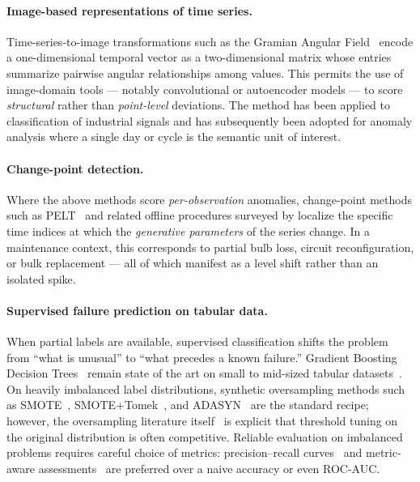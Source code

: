 \documentclass[11pt]{article}
\begin{document}
\paragraph{Image-based representations of time series.}
Time-series-to-image transformations such as the Gramian Angular Field~\cite{wang2015gaf,wang2015imaging} encode a one-dimensional temporal vector as a two-dimensional matrix whose entries summarize pairwise angular relationships among values. This permits the use of image-domain tools --- notably convolutional or autoencoder models --- to score \emph{structural} rather than \emph{point-level} deviations. The method has been applied to classification of industrial signals and has subsequently been adopted for anomaly analysis where a single day or cycle is the semantic unit of interest.

\paragraph{Change-point detection.}
Where the above methods score \emph{per-observation} anomalies, change-point methods such as PELT~\cite{killick2012pelt} and related offline procedures surveyed by \cite{truong2020ruptures,aminikhanghahi2017survey} localize the specific time indices at which the \emph{generative parameters} of the series change. In a maintenance context, this corresponds to partial bulb loss, circuit reconfiguration, or bulk replacement --- all of which manifest as a level shift rather than an isolated spike.

\paragraph{Supervised failure prediction on tabular data.}
When partial labels are available, supervised classification shifts the problem from ``what is unusual'' to ``what precedes a known failure.'' Gradient Boosting Decision Trees~\cite{friedman2001gbm,chen2016xgboost} remain state of the art on small to mid-sized tabular datasets~\cite{shwartz2022tabular}. On heavily imbalanced label distributions, synthetic oversampling methods such as SMOTE~\cite{chawla2002smote}, SMOTE+Tomek~\cite{batista2004study}, and ADASYN~\cite{he2008adasyn} are the standard recipe; however, the oversampling literature itself~\cite{fernandez2018smote} is explicit that threshold tuning on the original distribution is often competitive. Reliable evaluation on imbalanced problems requires careful choice of metrics: precision--recall curves~\cite{saito2015precision} and metric-aware assessments~\cite{hand2009measuring,fawcett2006roc} are preferred over a naive accuracy or even ROC-AUC.
\end{document}
